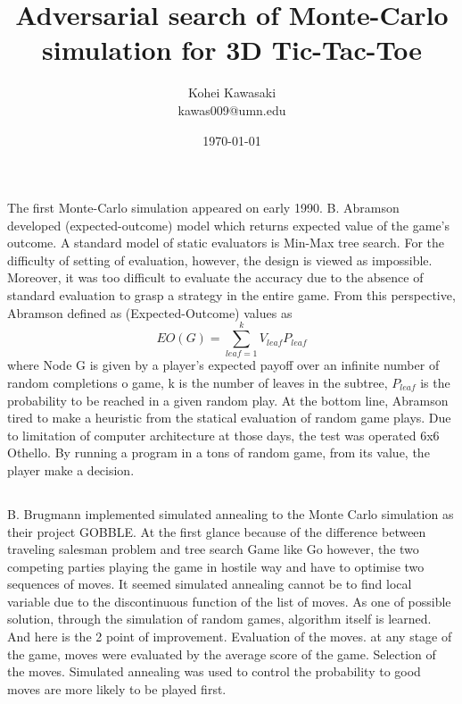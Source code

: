 \documentclass[11pt]{article}
\title{Adversarial search of Monte-Carlo simulation for 3D Tic-Tac-Toe}
\author{
Kohei Kawasaki\\kawas009@umn.edu
}
\date{\today}
\begin{document}
\maketitle
\subsection{}
The first Monte-Carlo simulation appeared on early 1990. B. Abramson developed (expected-outcome) model which returns expected value of the game’s outcome\cite{abramson1990expected}. A standard model of static evaluators is Min-Max tree search. For the difficulty of setting of evaluation, however, the design is viewed as impossible. Moreover, it was too difficult to evaluate the accuracy due to the absence of standard evaluation to grasp a strategy in the entire game. From this perspective, Abramson defined as (Expected-Outcome) values as 
\[EO(G) = \sum_{leaf=1}^{k} V_{leaf} P_{leaf}\]
where Node G is given by a player’s expected payoff over an infinite number of random completions o game, k is the number of leaves in the subtree, \(P_{leaf}\) is the probability to be reached in a given random play. At the bottom line, Abramson tired to make a heuristic from the statical evaluation of random game plays. Due to limitation of computer architecture at those days, the test was operated 6x6 Othello. By running a program in a tons of random game, from its value, the player make a decision. 
\subsection{}
B. Brugmann implemented simulated annealing to the Monte Carlo simulation as their project GOBBLE\cite{brugmann1993monte}. At the first glance because of the difference between traveling salesman problem and tree search Game like Go however, the two competing parties playing the game in hostile way and have to optimise two sequences of moves. It seemed simulated annealing cannot be to find local variable due to the discontinuous function of the list of moves. As one of possible solution, through the simulation of random games, algorithm itself is learned. And here is the 2 point of improvement. Evaluation of the moves. at any stage of the game, moves were evaluated by the average score of the game. Selection of the moves. Simulated annealing was used to control the probability to good moves are more likely to be played first.
\end{document}
